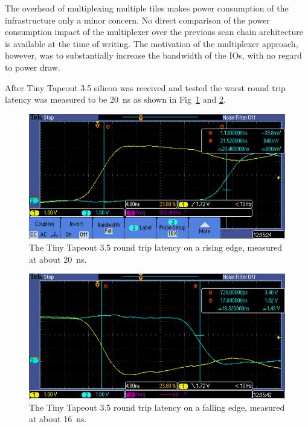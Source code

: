 The overhead of multiplexing multiple tiles makes power consumption of the infrastructure only a minor concern. No direct comparison of the power consumption impact of the multiplexer over the previous scan chain architecture is available at the time of writing. The motivation of the multiplexer approach, however, was to substantially increase the bandwidth of the IOs, with no regard to power draw.

After Tiny Tapeout 3.5 silicon was received and tested the worst round trip latency was measured to be \qty{20}{\ns} as shown in Fig~\ref{fig:round_trip_latency_rising_edge} and \ref{fig:round_trip_latency_falling_edge}.

\begin{figure}[!t]
\centering
\includegraphics[width=\columnwidth]{./Figs/tt3p5 rising latency.PNG}
\caption{The Tiny Tapeout 3.5 round trip latency on a rising edge, measured at about \qty{20}{\ns}.}
\label{fig:round_trip_latency_rising_edge}
\end{figure}

\begin{figure}[!t]
\centering
\includegraphics[width=\columnwidth]{./Figs/tt3p5 falling latency.PNG}
\caption{The Tiny Tapeout 3.5 round trip latency on a falling edge, measured at about \qty{16}{\ns}.}
\label{fig:round_trip_latency_falling_edge}
\end{figure}

